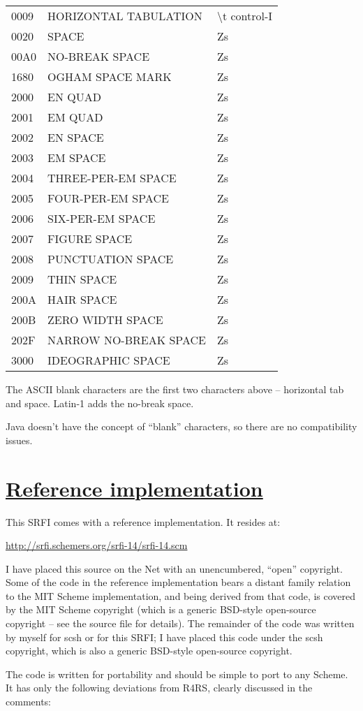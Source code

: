 \begin{longtable}[]{@{}lll@{}}
\toprule
0009 & HORIZONTAL TABULATION & \textbackslash{}t
control-I\tabularnewline
0020 & SPACE & Zs\tabularnewline
00A0 & NO-BREAK SPACE & Zs\tabularnewline
1680 & OGHAM SPACE MARK & Zs\tabularnewline
2000 & EN QUAD & Zs\tabularnewline
2001 & EM QUAD & Zs\tabularnewline
2002 & EN SPACE & Zs\tabularnewline
2003 & EM SPACE & Zs\tabularnewline
2004 & THREE-PER-EM SPACE & Zs\tabularnewline
2005 & FOUR-PER-EM SPACE & Zs\tabularnewline
2006 & SIX-PER-EM SPACE & Zs\tabularnewline
2007 & FIGURE SPACE & Zs\tabularnewline
2008 & PUNCTUATION SPACE & Zs\tabularnewline
2009 & THIN SPACE & Zs\tabularnewline
200A & HAIR SPACE & Zs\tabularnewline
200B & ZERO WIDTH SPACE & Zs\tabularnewline
202F & NARROW NO-BREAK SPACE & Zs\tabularnewline
3000 & IDEOGRAPHIC SPACE & Zs\tabularnewline
\bottomrule
\end{longtable}

The ASCII blank characters are the first two characters above --
horizontal tab and space. Latin-1 adds the no-break space.

Java doesn't have the concept of ``blank'' characters, so there are no
compatibility issues.

\section{\texorpdfstring{\href{}{Reference
implementation}}{Reference implementation}}\label{reference-implementation}

This SRFI comes with a reference implementation. It resides at:

\url{http://srfi.schemers.org/srfi-14/srfi-14.scm}

I have placed this source on the Net with an unencumbered, ``open''
copyright. Some of the code in the reference implementation bears a
distant family relation to the MIT Scheme implementation, and being
derived from that code, is covered by the MIT Scheme copyright (which is
a generic BSD-style open-source copyright -- see the source file for
details). The remainder of the code was written by myself for scsh or
for this SRFI; I have placed this code under the scsh copyright, which
is also a generic BSD-style open-source copyright.

The code is written for portability and should be simple to port to any
Scheme. It has only the following deviations from R4RS, clearly
discussed in the comments:

